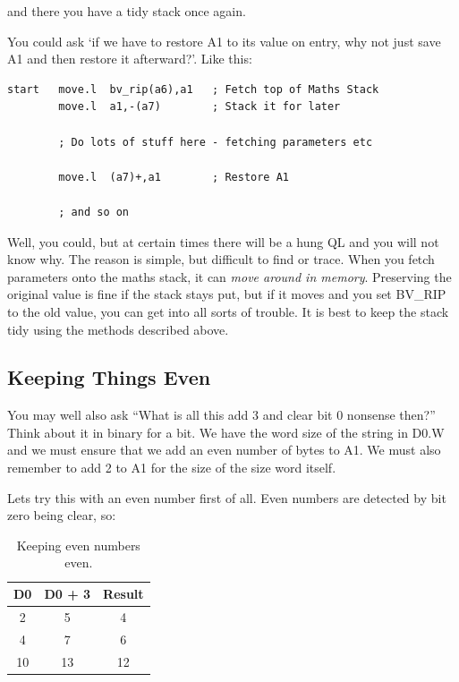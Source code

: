 and there you have a tidy stack once again.

You could ask `if we have to restore A1 to its value on entry, why
    not just save A1 and then restore it afterward?'. Like this:

\begin{lstlisting}[firstnumber=1,caption={How to Hang the QL},label={lst:HowToHangTheQL}]
start   move.l  bv_rip(a6),a1   ; Fetch top of Maths Stack
        move.l  a1,-(a7)        ; Stack it for later

        ; Do lots of stuff here - fetching parameters etc

        move.l  (a7)+,a1        ; Restore A1

        ; and so on
\end{lstlisting}

Well, you could, but at certain times there will be a hung QL and
    you will not know why. The reason is simple, but difficult to find or
    trace. When you fetch parameters onto the maths stack, it can \emph{move around in memory}. Preserving the original value is fine if the stack stays put, but
    if it moves and you set BV\_RIP to the old value, you can get into all
    sorts of trouble. It is best to keep the stack tidy using the methods
    described above.

\subsection{Keeping Things Even}
\label{ch7-keep-things-even}%

You may well also ask ``What is all this add 3 and clear bit 0
      nonsense then?'' Think about it in binary for a bit. We have the word
      size of the string in D0.W and we must ensure that we add an even number
      of bytes to A1. We must also remember to add 2 to A1 for the size of the
      size word itself.

Lets try this with an even number first of all. Even numbers are
      detected by bit zero being clear, so:
\begin{table}[htbp]
\centering
\begin{tabular}{c c c}  %
\toprule
\textbf{D0} & \textbf{D0 + 3} & \textbf{Result} \\
\midrule
%
2 & 5 & 4\\
4 & 7 & 6\\
10 & 13 & 12\\
%
\bottomrule
\end{tabular}
\caption{Keeping even numbers even.}
\label{tab:KeepingEvenNumbersEven}
\end{table}

